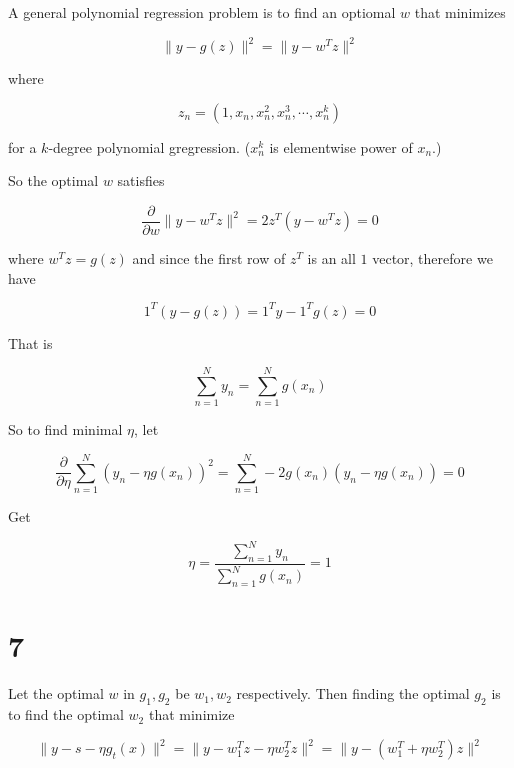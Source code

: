 \documentclass[fleqn,a4paper,12pt]{article}
\begin{document}
A general polynomial regression problem is to find an optiomal $w$ that minimizes

\begin{equation*}
  \lVert y - g(z) \rVert^2 = \lVert y - w^T z \rVert^2
\end{equation*}

where

\begin{equation*}
z_n = (1, x_n, x_n^2, x_n^3, \cdots, x_n^k)
\end{equation*}

for a $k$-degree polynomial gregression. ($x_n^k$ is elementwise power of $x_n$.)

So the optimal $w$ satisfies

\begin{equation*}
  \frac{\partial}{\partial w} \lVert y - w^T z \rVert^2 = 2z^T(y - w^T z) = 0
\end{equation*}

where $w^Tz = g(z)$ and since the first row of $z^T$ is an all $1$ vector, therefore we have

\begin{equation*}
  1^T(y - g(z)) = 1^T y - 1^T g(z) = 0
\end{equation*}

That is

\begin{equation*}
  \sum_{n=1}^N y_n = \sum_{n=1}^N g(x_n)
\end{equation*}

So to find minimal $\eta$, let

\begin{equation*}
  \frac{\partial}{\partial \eta} \sum_{n=1}^{N} (y_n - \eta g(x_n))^2 = \sum_{n=1}^N -2 g(x_n) (y_n - \eta g(x_n)) = 0
\end{equation*}

Get

\begin{equation*}
  \eta = \frac{\sum_{n=1}^N y_n}{\sum_{n=1}^N g(x_n)} = 1
\end{equation*}

\section*{7}

Let the optimal $w$ in $g_1, g_2$ be $w_1, w_2$ respectively. Then finding the optimal $g_2$ is to find the optimal $w_2$ that minimize

\begin{equation*}
  \lVert y - s - \eta g_t(x) \rVert^2 = \lVert y - w_1^T z - \eta w_2^T z \rVert^2 = \lVert y - (w_1^T +  \eta w_2^T) z \rVert^2
\end{equation*}
\end{document}

